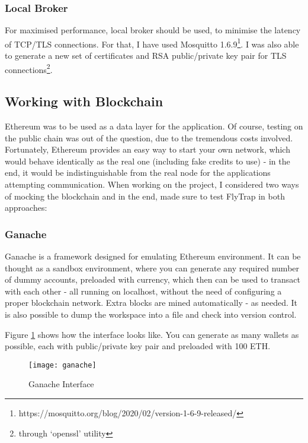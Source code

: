 \subsubsection{Local Broker}
For maximised performance, local broker should be used, to minimise the latency of TCP/TLS connections. For that, I have used Mosquitto 1.6.9\footnote{https://mosquitto.org/blog/2020/02/version-1-6-9-released/}. I was also able to generate a new set of certificates and RSA public/private key pair for TLS connections\footnote{through `openssl' utility}.  
\subsection{Working with Blockchain}
Ethereum was to be used as a data layer for the application. Of course, testing on the public chain was out of the question, due to the tremendous costs involved. Fortunately, Ethereum provides an easy way to start your own network, which would behave identically as the real one (including fake credits to use) - in the end, it would be indistinguishable from the real node for the applications attempting communication. When working on the project, I considered two ways of mocking the blockchain and in the end, made sure to test FlyTrap in both approaches:
\subsubsection{Ganache}
Ganache\cite{lee2019testing} is a framework designed for emulating Ethereum environment. It can be thought as a sandbox environment, where you can generate any required number of dummy accounts, preloaded with currency, which then can be used to transact with each other - all running on localhost, without the need of configuring a proper blockchain network. Extra blocks are mined automatically - as needed. It is also possible to dump the workspace into a file and check into version control.

Figure \ref{fig:ganache} shows how the interface looks like. You can generate as many wallets as possible, each with public/private key pair and preloaded with 100 ETH.
\begin{figure}[h]
    \centering
    \texttt{[image: ganache]}
    \caption{Ganache Interface}
    \label{fig:ganache}
\end{figure}

